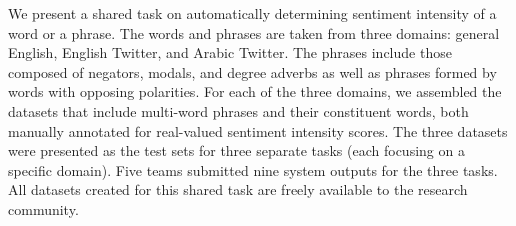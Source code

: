 We present a shared task on automatically determining sentiment intensity of a word or a phrase. The words and phrases are taken from three domains: general English, English Twitter, and Arabic Twitter. The phrases include those composed of negators, modals, and degree adverbs as well as phrases formed by words with opposing polarities. For each of the three domains, we assembled the datasets that include multi-word phrases and their constituent words, both manually annotated for real-valued sentiment intensity scores. The three datasets were presented as the test sets for three separate tasks (each focusing on a specific domain). Five teams submitted nine system outputs for the three tasks. All datasets created for this shared task are freely available to the research community.
